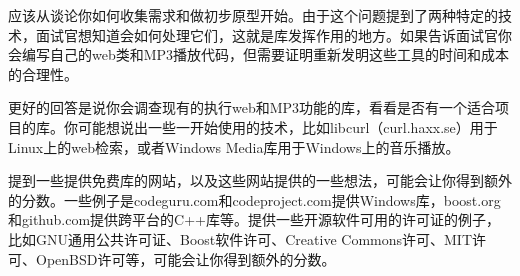 应该从谈论你如何收集需求和做初步原型开始。由于这个问题提到了两种特定的技术，面试官想知道会如何处理它们，这就是库发挥作用的地方。如果告诉面试官你会编写自己的web类和MP3播放代码，但需要证明重新发明这些工具的时间和成本的合理性。

更好的回答是说你会调查现有的执行web和MP3功能的库，看看是否有一个适合项目的库。你可能想说出一些一开始使用的技术，比如libcurl（curl.haxx.se）用于Linux上的web检索，或者Windows Media库用于Windows上的音乐播放。

提到一些提供免费库的网站，以及这些网站提供的一些想法，可能会让你得到额外的分数。一些例子是codeguru.com和codeproject.com提供Windows库，boost.org和github.com提供跨平台的C++库等。提供一些开源软件可用的许可证的例子，比如GNU通用公共许可证、Boost软件许可、Creative Commons许可、MIT许可、OpenBSD许可等，可能会让你得到额外的分数。

